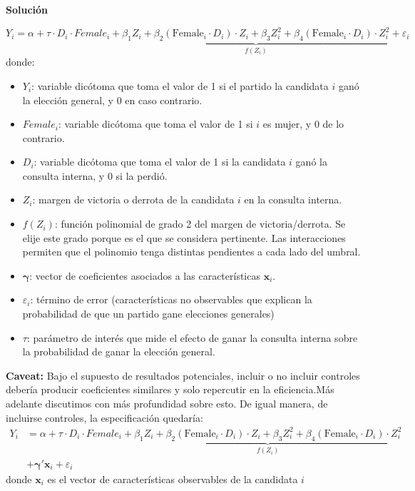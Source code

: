 \documentclass[a4paper, answers, addpoints, 11pt]{exam}
\newenvironment{solucion}{%
  \begin{mdframed}[
    backgroundcolor=blue!5,    %
    linecolor=blue!50,          %
    linewidth=2pt,              %
    leftmargin=10pt,            %
    rightmargin=8pt,           %
    topline=true,              %
    bottomline=true,            %
    roundcorner=10pt,           %
    innerleftmargin=10pt,       %
    innerrightmargin=10pt,      %
    innerbottommargin=10pt,     %
    innertopmargin=10pt         %
  ]%
  \begin{tcolorbox}[colframe=blue!50!black, colback=blue!50, coltitle=white, sharp corners=all, boxrule=1mm, width=\textwidth, halign=left, valign=center, top=0mm, bottom=0mm, left=0mm, right=0mm] \textbf{Solución} \end{tcolorbox} }{\end{mdframed}}
\begin{document}
\begin{enumerate}
\begin{enumerate}
\begin{solucion}
\begin{equation*}
Y_i = \alpha  +\tau \cdot D_i \cdot Female_i + 
\underbrace{\beta_1 Z_i +\beta_2 (\text{Female}_i \cdot D_i )\cdot Z_i +\beta_3 Z_i^2+ \beta_4 (\text{Female}_i \cdot D_i )\cdot Z_i^2 }_{f(Z_i)} 
+ \varepsilon_i
\end{equation*}
donde:
\begin{itemize}
    \item \( Y_i \): variable dicótoma que toma el valor de 1 si el partido la candidata \( i \) ganó la elección general, y 0 en caso contrario.
     \item \( Female_i \): variable dicótoma que toma el valor de 1 si \( i \) es mujer, y 0 de lo contrario.
    \item \( D_i \): variable dicótoma que toma el valor de 1 si la candidata \( i \) ganó la consulta interna, y 0 si la perdió.
    \item \( Z_i \): margen de victoria o derrota de la candidata \( i \) en la consulta interna.
   \item $ f(Z_i)$: función polinomial de grado 2 del margen de victoria/derrota. Se elije este grado porque es el que se considera pertinente. Las interacciones permiten que el polinomio tenga distintas pendientes a cada lado del umbral.  
    \item \( \boldsymbol{\gamma} \): vector de coeficientes asociados a las características \( \mathbf{x}_i \).
    \item \( \varepsilon_i \): término de error (características no observables que explican la probabilidad de que un partido gane elecciones generales)
    \item \( \tau \): parámetro de interés que mide el efecto de ganar la consulta interna sobre la probabilidad de ganar la elección general.
\end{itemize}
\begin{mdframed}[backgroundcolor=moraditoClaro]
\textbf{Caveat:} Bajo el supuesto de resultados potenciales, incluir o no incluir controles debería producir coeficientes similares y solo repercutir en la eficiencia.Más adelante discutimos con más profundidad sobre esto. De igual manera, de incluirse controles, la especificación quedaría: \begin{align*}
Y_i &= \alpha  +\tau \cdot D_i \cdot Female_i + 
\underbrace{\beta_1 Z_i +\beta_2 (\text{Female}_i \cdot D_i )\cdot Z_i +\beta_3 Z_i^2+ \beta_4 (\text{Female}_i \cdot D_i )\cdot Z_i^2 }_{f(Z_i)} \\
&+ \boldsymbol{\gamma}' \mathbf{x}_i + \varepsilon_i
\end{align*}
donde \( \mathbf{x}_i \) es el vector de características observables de la candidata  \( i \)
\end{mdframed}


\end{solucion}
\end{enumerate}
\end{enumerate}
\end{document}
